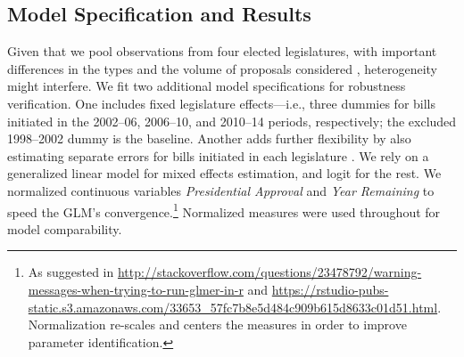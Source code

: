 \documentclass[letter,12pt]{article}
\begin{document}
\subsection*{Model Specification and Results}

Given that we pool observations from four elected legislatures, with important differences in the types and the volume of proposals considered \citep{aleman.navia.UrgChi.2009}, heterogeneity might interfere. We fit two additional model specifications for robustness verification. One includes fixed legislature effects---i.e., three dummies for bills initiated in the 2002--06, 2006--10, and 2010--14 periods, respectively; the excluded 1998--2002 dummy is the baseline. Another adds further flexibility by also estimating separate errors for bills initiated in each legislature \citep[a so-called mixed effects model,][, 262--302]{gelman.hill.2007}. We rely on a generalized linear model for mixed effects estimation, and logit for the rest. We normalized continuous variables \emph{Presidential Approval} and \emph{Year Remaining} to speed the GLM's convergence.\footnote{As suggested in \url{http://stackoverflow.com/questions/23478792/warning-messages-when-trying-to-run-glmer-in-r} and \url{https://rstudio-pubs-static.s3.amazonaws.com/33653_57fc7b8e5d484c909b615d8633c01d51.html}. Normalization re-scales and centers the measures in order to improve parameter identification.} Normalized measures were used throughout for model comparability.

\end{document}
